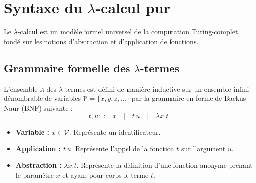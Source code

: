 \documentclass{article}
\begin{document}

\section{Syntaxe du \texorpdfstring{$\lambda$}{lambda}-calcul pur}

Le $\lambda$-calcul est un modèle formel universel de la computation Turing-complet, fondé sur les notions d'abstraction et d'application de fonctions.

\subsection{Grammaire formelle des \texorpdfstring{$\lambda$}{lambda}-termes}

L'ensemble $\Lambda$ des $\lambda$-termes est défini de manière inductive sur un ensemble infini dénombrable de variables $\mathcal{V} = \{x, y, z, \dots\}$ par la grammaire en forme de Backus-Naur (BNF) suivante :
\[ t, u ::= x \quad | \quad t\,u \quad | \quad \lambda x. t \]

\begin{itemize}
    \item \textbf{Variable :} $x \in \mathcal{V}$. Représente un identificateur.
    \item \textbf{Application :} $t\,u$. Représente l'appel de la fonction $t$ sur l'argument $u$.
    \item \textbf{Abstraction :} $\lambda x. t$. Représente la définition d'une fonction anonyme prenant le paramètre $x$ et ayant pour corps le terme $t$.
\end{itemize}

\end{document}
